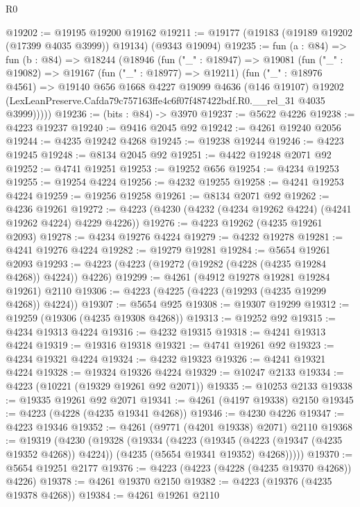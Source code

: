 \begin{lexlean}{R0}
\begin{coremodule}
@19202 := @19195 @19200 @19162
@19211 := @19177 (@19183 (@19189 @19202 (@17399 @4035 @3999)) @19134) (@9343 @19094)
@19235 := fun (a : @84) =>
  fun (b : @84) =>
  @18244
    (@18946
      (fun ("_" : @18947) =>
      @19081
        (fun ("_" : @19082) =>
        @19167
          (fun ("_" : @18977) => @19211)
          (fun ("_" : @18976 @4561) =>
          @19140
            @656
            @1668
            @4227
            @19099
            @4636
            (@146 @19107)
            @19202
            (LexLeanPreserve.Cafda79c757163ffe4c6f07f487422bdf.R0.__rel_31 @4035 @3999)))))
@19236 := (bits : @84) -> @3970
@19237 := @5622 @4226
@19238 := @4223 @19237
@19240 := @9416 @2045 @92
@19242 := @4261 @19240 @2056
@19244 := @4235 @19242 @4268
@19245 := @19238 @19244
@19246 := @4223 @19245
@19248 := @8134 @2045 @92
@19251 := @4422 @19248 @2071 @92
@19252 := @4741 @19251
@19253 := @19252 @656
@19254 := @4234 @19253
@19255 := @19254 @4224
@19256 := @4232 @19255
@19258 := @4241 @19253 @4224
@19259 := @19256 @19258
@19261 := @8134 @2071 @92
@19262 := @4236 @19261
@19272 := @4223 (@4230 (@4232 (@4234 @19262 @4224) (@4241 @19262 @4224) @4229 @4226))
@19276 := @4223 @19262 (@4235 @19261 @2093)
@19278 := @4234 @19276 @4224
@19279 := @4232 @19278
@19281 := @4241 @19276 @4224
@19282 := @19279 @19281
@19284 := @5654 @19261 @2093
@19293 := @4223 (@4223 (@19272 (@19282 (@4228 (@4235 @19284 @4268)) @4224)) @4226)
@19299 := @4261 (@4912 @19278 @19281 @19284 @19261) @2110
@19306 := @4223 (@4225 (@4223 (@19293 (@4235 @19299 @4268)) @4224))
@19307 := @5654 @925
@19308 := @19307 @19299
@19312 := @19259 (@19306 (@4235 @19308 @4268))
@19313 := @19252 @92
@19315 := @4234 @19313 @4224
@19316 := @4232 @19315
@19318 := @4241 @19313 @4224
@19319 := @19316 @19318
@19321 := @4741 @19261 @92
@19323 := @4234 @19321 @4224
@19324 := @4232 @19323
@19326 := @4241 @19321 @4224
@19328 := @19324 @19326 @4224
@19329 := @10247 @2133
@19334 := @4223 (@10221 (@19329 @19261 @92 @2071))
@19335 := @10253 @2133
@19338 := @19335 @19261 @92 @2071
@19341 := @4261 (@4197 @19338) @2150
@19345 := @4223 (@4228 (@4235 @19341 @4268))
@19346 := @4230 @4226
@19347 := @4223 @19346
@19352 := @4261 (@9771 (@4201 @19338) @2071) @2110
@19368 := @19319
    (@4230
      (@19328
        (@19334
          (@4223
            (@19345 (@4223 (@19347 (@4235 @19352 @4268)) @4224))
            (@4235 (@5654 @19341 @19352) @4268)))))
@19370 := @5654 @19251 @2177
@19376 := @4223 (@4223 (@4228 (@4235 @19370 @4268)) @4226)
@19378 := @4261 @19370 @2150
@19382 := @4223 (@19376 (@4235 @19378 @4268))
@19384 := @4261 @19261 @2110

\end{coremodule}
\end{lexlean}
